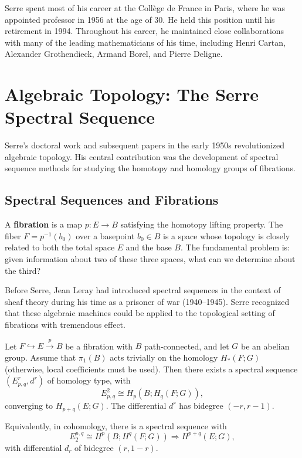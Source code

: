 Serre spent most of his career at the Coll\`ege de France in Paris, where he was appointed professor in 1956 at the age of 30. He held this position until his retirement in 1994. Throughout his career, he maintained close collaborations with many of the leading mathematicians of his time, including Henri Cartan, Alexander Grothendieck, Armand Borel, and Pierre Deligne.

\section[Algebraic Topology: Serre Spectral Sequence]{Algebraic Topology: The Serre Spectral Sequence}

Serre's doctoral work and subsequent papers in the early 1950s revolutionized algebraic topology. His central contribution was the development of spectral sequence methods for studying the homotopy and homology groups of fibrations.

\subsection{Spectral Sequences and Fibrations}

A \textbf{fibration} is a map \(p: E \to B\) satisfying the homotopy lifting property. The fiber \(F = p^{-1}(b_0)\) over a basepoint \(b_0 \in B\) is a space whose topology is closely related to both the total space \(E\) and the base \(B\). The fundamental problem is: given information about two of these three spaces, what can we determine about the third?

Before Serre, Jean Leray had introduced spectral sequences in the context of sheaf theory during his time as a prisoner of war (1940--1945). Serre recognized that these algebraic machines could be applied to the topological setting of fibrations with tremendous effect.

\begin{theorem}
Let \(F \hookrightarrow E \xrightarrow{p} B\) be a fibration with \(B\) path-connected, and let \(G\) be an abelian group. Assume that \(\pi_1(B)\) acts trivially on the homology \(H_*(F; G)\) (otherwise, local coefficients must be used). Then there exists a spectral sequence \((E^r_{p,q}, d^r)\) of homology type, with
\[
E^2_{p,q} \cong H_p(B; H_q(F; G)),
\]
converging to \(H_{p+q}(E; G)\). The differential \(d^r\) has bidegree \((-r, r-1)\).

Equivalently, in cohomology, there is a spectral sequence with
\[
E_2^{p,q} \cong H^p(B; H^q(F; G)) \Rightarrow H^{p+q}(E; G),
\]
with differential \(d_r\) of bidegree \((r, 1-r)\).
\end{theorem}

